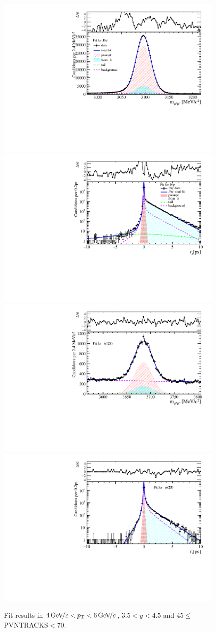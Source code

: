 \begin{figure}[H]
\begin{center}
\includegraphics[width=0.47\linewidth]{pdf/Jpsi/drawmass/n3y3pt3.pdf}
\includegraphics[width=0.47\linewidth]{pdf/Jpsi/2DFit/n3y3pt3.pdf}
\vspace*{-0.5cm}
\includegraphics[width=0.47\linewidth]{pdf/Psi2S/drawmass/n3y3pt3.pdf}
\includegraphics[width=0.47\linewidth]{pdf/Psi2S/2DFit/n3y3pt3.pdf}
\vspace*{-0.5cm}
\end{center}
\caption{Fit results in $4\text{\,Ge\kern -0.1em V\!/}c<p_{\mathrm{T}}<6\text{\,Ge\kern -0.1em V\!/}c$, $3.5<y<4.5$ and 45$\leq$PVNTRACKS$<$70.}
\label{Fitn3y3pt3}
\end{figure}
